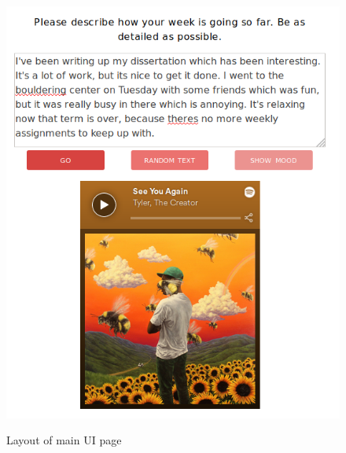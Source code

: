 \begin{figure}[ht]
\caption{Layout of main UI page}
\centering
\includegraphics[scale=0.4]{implementation/tamara.png}
\label{UIlayout}
\end{figure}

